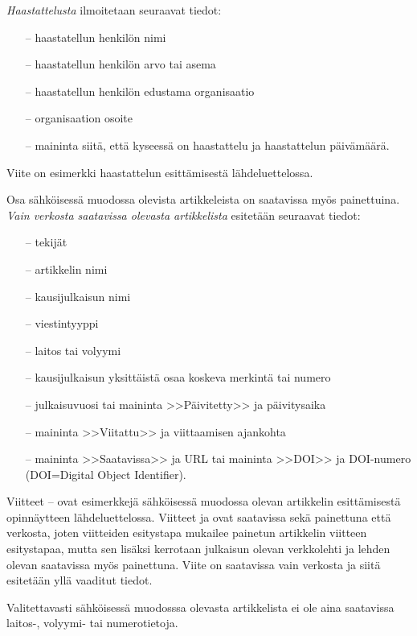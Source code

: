 \documentclass[english,12pt,a4paper,pdftex,elec,utf8]{aaltothesis}
\begin{document}
\textit{Haastattelusta} ilmoitetaan seuraavat tiedot:

\begin{itemize}
\item[--]haastatellun henkil\"on nimi
\item[--]haastatellun henkil\"on arvo tai asema
\item[--]haastatellun henkil\"on edustama organisaatio
\item[--]organisaation osoite
\item[--]maininta siit\"a, ett\"a kyseess\"a on haastattelu ja haastattelun
p\"aiv\"am\"a\"ar\"a.
\end{itemize}

Viite \cite{haastattelu} on esimerkki
haastattelun esitt\"amisest\"a l\"ahdeluettelossa.

Osa s\"ahk\"oisess\"a muodossa olevista artikkeleista on saatavissa my\"os
painettuina. \textit{Vain verkosta saatavissa olevasta artikkelista} esitet\"a\"an
seuraavat tiedot:

\begin{itemize}
\item[--]tekij\"at
\item[--]artikkelin nimi
\item[--]kausijulkaisun nimi
\item[--]viestintyyppi
\item[--]laitos tai volyymi
\item[--]kausijulkaisun yksitt\"aist\"a osaa koskeva merkint\"a tai numero
\item[--]julkaisuvuosi tai maininta >>P\"aivitetty>> ja p\"aivitysaika
\item[--]maininta >>Viitattu>> ja viittaamisen ajankohta
\item[--]maininta >>Saatavissa>> ja URL tai
        maininta >>DOI>> ja DOI-numero (DOI=Digital Object Identifier).
\end{itemize}

Viitteet \cite{Ribeiro}--\cite{kone} ovat esimerkkej\"a s\"ahk\"oisess\"a
muodossa olevan artikkelin esitt\"amisest\"a opinn\"aytteen
l\"ahdeluettelossa.  Viitteet \cite{Ribeiro} ja \cite{Stieber} ovat
saatavissa sek\"a painettuna ett\"a verkosta, joten viitteiden esitystapa
mukailee painetun artikkelin viitteen esitystapaa, mutta sen lis\"aksi
kerrotaan julkaisun olevan verkkolehti ja lehden olevan saatavissa
my\"os painettuna.  Viite \cite{kone} on saatavissa vain verkosta ja
siit\"a esitet\"a\"an yll\"a vaaditut tiedot.

Valitettavasti s\"ahk\"oisess\"a muodosssa olevasta artikkelista ei ole aina
saatavissa lai\-tos-, volyymi- tai numerotietoja.
\end{document}
